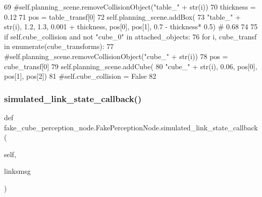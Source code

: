 \begin{DoxyCode}
69                     \textcolor{comment}{#self.planning\_scene.removeCollisionObject("table\_" + str(i))}
70                     thickness = 0.12
71                     pos = table\_transf[0]
72                     self.planning\_scene.addBox(
73                         \textcolor{stringliteral}{"table\_"} + str(i), 1.2, 1.3, 0.001 + thickness, pos[0],  pos[1],  0.7 -  thickness*
      0.5)  \textcolor{comment}{# 0.68}
74 
75             \textcolor{keywordflow}{if} self.cube\_collision \textcolor{keywordflow}{and} \textcolor{keywordflow}{not} \textcolor{stringliteral}{"cube\_0"} \textcolor{keywordflow}{in} attached\_objects:
76                 \textcolor{keywordflow}{for} i, cube\_transf \textcolor{keywordflow}{in} enumerate(cube\_transforms):
77                     \textcolor{comment}{#self.planning\_scene.removeCollisionObject("cube\_" + str(i))}
78                     pos = cube\_transf[0]
79                     self.planning\_scene.addCube(
80                         \textcolor{stringliteral}{"cube\_"} + str(i), 0.06, pos[0],  pos[1],  pos[2])
81                     \textcolor{comment}{#self.cube\_collision = False}
82 
\end{DoxyCode}
\mbox{\label{classfake__cube__perception__node_1_1FakePerceptionNode_ac1127eae8d2eda994b22873529bd198f}} 
\subsubsection{\texorpdfstring{simulated\+\_\+link\+\_\+state\+\_\+callback()}{simulated\_link\_state\_callback()}\hspace{0.1cm}{\footnotesize\ttfamily [2/2]}}
{\footnotesize\ttfamily def fake\+\_\+cube\+\_\+perception\+\_\+node.\+Fake\+Perception\+Node.\+simulated\+\_\+link\+\_\+state\+\_\+callback (\begin{DoxyParamCaption}\item[{}]{self,  }\item[{}]{linksmsg }\end{DoxyParamCaption})}

